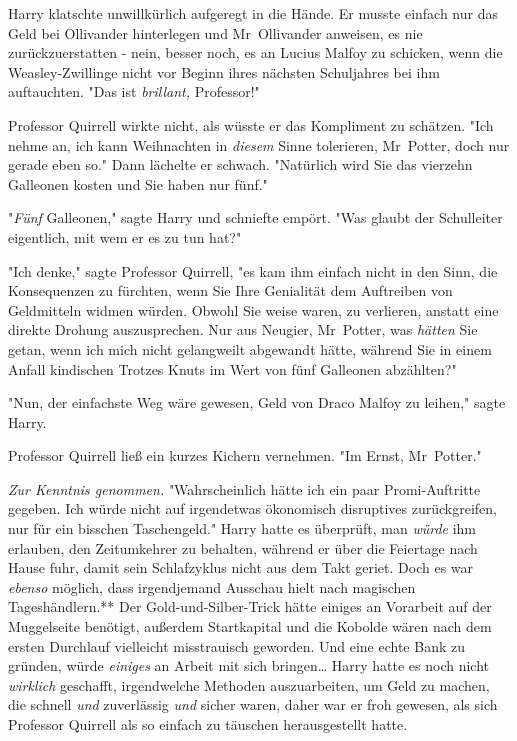 {Harry klatschte unwillkürlich aufgeregt in die Hände. Er musste einfach nur das Geld bei Ollivander hinterlegen und Mr~Ollivander anweisen, es nie zurückzuerstatten - nein, besser noch, es an Lucius Malfoy zu schicken, wenn die Weasley-Zwillinge nicht vor Beginn ihres nächsten Schuljahres bei ihm auftauchten. "Das ist \emph{brillant,} Professor!"

Professor Quirrell wirkte nicht, als wüsste er das Kompliment zu schätzen. "Ich nehme an, ich kann Weihnachten in \emph{diesem} Sinne tolerieren, Mr~Potter, doch nur gerade eben so." Dann lächelte er schwach. "Natürlich wird Sie das vierzehn Galleonen kosten und Sie haben nur fünf."

"\emph{Fünf} Galleonen," sagte Harry und schniefte empört. "Was glaubt der Schulleiter eigentlich, mit wem er es zu tun hat?"

"Ich denke," sagte Professor Quirrell, "es kam ihm einfach nicht in den Sinn, die Konsequenzen zu fürchten, wenn Sie Ihre Genialität dem Auftreiben von Geldmitteln widmen würden. Obwohl Sie weise waren, zu verlieren, anstatt eine direkte Drohung auszusprechen. Nur aus Neugier, Mr~Potter, was \emph{hätten} Sie getan, wenn ich mich nicht gelangweilt abgewandt hätte, während Sie in einem Anfall kindischen Trotzes Knuts im Wert von fünf Galleonen abzählten?"

"Nun, der einfachste Weg wäre gewesen, Geld von Draco Malfoy zu leihen," sagte Harry.

Professor Quirrell ließ ein kurzes Kichern vernehmen. "Im Ernst, Mr~Potter."

\emph{Zur Kenntnis genommen.} "Wahrscheinlich hätte ich ein paar Promi-Auftritte gegeben. Ich würde nicht auf irgendetwas ökonomisch disruptives zurückgreifen, nur für ein bisschen Taschengeld." Harry hatte es überprüft, man \emph{würde} ihm erlauben, den Zeitumkehrer zu behalten, während er über die Feiertage nach Hause fuhr, damit sein Schlafzyklus nicht aus dem Takt geriet. Doch es war \emph{ebenso} möglich, dass irgendjemand Ausschau hielt nach magischen Tageshändlern.** Der Gold-und-Silber-Trick hätte einiges an Vorarbeit auf der Muggelseite benötigt, außerdem Startkapital und die Kobolde wären nach dem ersten Durchlauf vielleicht misstrauisch geworden. Und eine echte Bank zu gründen, würde \emph{einiges} an Arbeit mit sich bringen… Harry hatte es noch nicht \emph{wirklich} geschafft, irgendwelche Methoden auszuarbeiten, um Geld zu machen, die schnell \emph{und} zuverlässig \emph{und} sicher waren, daher war er froh gewesen, als sich Professor Quirrell als so einfach zu täuschen herausgestellt hatte.

}
